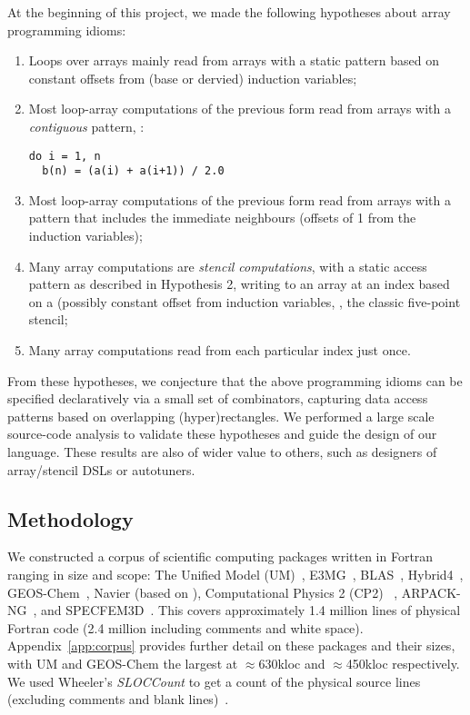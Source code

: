 
At the beginning of this project, we made the following hypotheses
about array programming idioms:
\begin{enumerate}
\item Loops over arrays mainly read from arrays with a static pattern
based on constant offsets from (base or dervied) induction variables;

\item Most loop-array computations of the previous form read
from arrays with a \emph{contiguous} pattern, \eg{}:
%
\begin{verbatim}
do i = 1, n
  b(n) = (a(i) + a(i+1)) / 2.0
\end{verbatim}
%
\item Most loop-array computations of the previous form read
from arrays with a pattern that includes the immediate
neighbours (offsets of 1 from the induction variables);

\item Many array computations are \emph{stencil computations},
with a static access pattern as described in Hypothesis 2, writing
to an array at an index based on a (possibly constant offset from induction
variables, \eg{}, the classic five-point stencil;

\item Many array computations read from each particular index just once.
\end{enumerate}
%
From these hypotheses, we conjecture that the above programming idioms
can be specified declaratively via a small
set of combinators, capturing data access patterns based on
overlapping (hyper)rectangles. We performed a large scale source-code
analysis to validate these hypotheses and guide the design of our
language. These results are also of wider value to others, such as
designers of array/stencil DSLs or autotuners.

\subsection{Methodology}
%
\noindent
We constructed a corpus of \numPackages{} scientific computing
packages written in Fortran ranging in size and scope: The Unified
Model (UM)~\cite{um}, E3MG~\cite{RePEc:aen:journl:2006se-a12},
BLAS~\cite{blas}, Hybrid4~\cite{GBC:GBC635},
GEOS-Chem~\cite{geos-chem}, Navier (based on
\cite{griebel1997numerical}), Computational Physics 2 (CP2)
~\cite{nicholas2006computational}, ARPACK-NG~\cite{arpackng}, and
SPECFEM3D~\cite{specfem3d}.  This covers
approximately 1.4 million lines of physical Fortran code (2.4 million
including comments and white space).  Appendix~\ref{app:corpus}
provides further detail on these packages and their sizes, with UM and
GEOS-Chem the largest at $\approx$630kloc and $\approx$450kloc respectively. We used
Wheeler's \emph{SLOCCount} to get a count of the physical source lines
(excluding comments and blank lines)~\cite{wheeler2001sloccount}.

